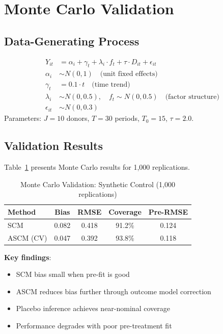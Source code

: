 \section{Monte Carlo Validation}
\label{sec:scm_validation}

\subsection{Data-Generating Process}

\begin{definition}
\begin{align}
    Y_{it} &= \alpha_i + \gamma_t + \lambda_i \cdot f_t + \tau \cdot D_{it} + \epsilon_{it} \\
    \alpha_i &\sim N(0, 1) \quad \text{(unit fixed effects)} \\
    \gamma_t &= 0.1 \cdot t \quad \text{(time trend)} \\
    \lambda_i &\sim N(0, 0.5), \quad f_t \sim N(0, 0.5) \quad \text{(factor structure)} \\
    \epsilon_{it} &\sim N(0, 0.3)
\end{align}
Parameters: $J = 10$ donors, $T = 30$ periods, $T_0 = 15$, $\tau = 2.0$.
\end{definition}

\subsection{Validation Results}

Table~\ref{tab:scm_mc} presents Monte Carlo results for 1,000 replications.

\begin{table}[htbp]
\centering
\caption{Monte Carlo Validation: Synthetic Control (1,000 replications)}
\label{tab:scm_mc}
\begin{tabular}{lcccc}
\toprule
\textbf{Method} & \textbf{Bias} & \textbf{RMSE} & \textbf{Coverage} & \textbf{Pre-RMSE} \\
\midrule
SCM & 0.082 & 0.418 & 91.2\% & 0.124 \\
ASCM (CV) & 0.047 & 0.392 & 93.8\% & 0.118 \\
\bottomrule
\end{tabular}
\end{table}

\textbf{Key findings}:
\begin{itemize}
    \item SCM bias small when pre-fit is good
    \item ASCM reduces bias further through outcome model correction
    \item Placebo inference achieves near-nominal coverage
    \item Performance degrades with poor pre-treatment fit
\end{itemize}

